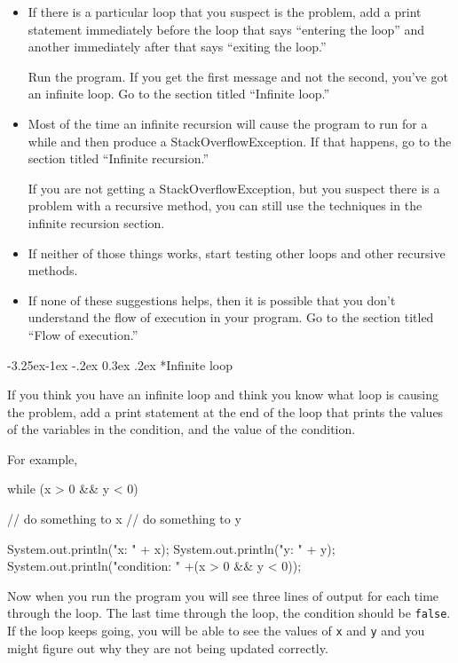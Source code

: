 \documentclass{book}
\makeatletter
\renewcommand\subsubsection{\@startsection {subsubsection}{3}{0mm}%
    {-3.25ex\@plus -1ex \@minus -.2ex}%
    {0.3ex \@plus .2ex}%
    {\normalfont\normalsize\bfseries}}
\makeatother
\begin{document}
\begin{itemize}

\item If there is a particular loop that you suspect is the
problem, add a print statement immediately before the loop
that says
``entering the loop'' and another immediately after that
says ``exiting the loop.''

Run the program.  If you get the first message and not
the second, you've got an infinite loop.  Go to the section
titled ``Infinite loop.''

\item Most of the time an infinite recursion will cause the program
to run for a while and then produce a StackOverflowException.
If that happens, go to the section
titled ``Infinite recursion.''

If you are not getting a StackOverflowException, but you suspect
there is a problem with a recursive method, you can still use
the techniques in the infinite recursion section.

\item If neither of those things works, start testing other
loops and other recursive methods.

\item If none of these suggestions helps, then it is possible that
you don't understand the flow of execution in your program.
Go to the section titled ``Flow of execution.''

\end{itemize}


\subsubsection*{Infinite loop}

If you think you have an infinite loop and think you know
what loop is causing the problem, add a print statement at
the end of the loop that prints the values of the variables in
the condition, and the value of the condition.

For example,

\begin{verbatimtab}
    while (x > 0 && y < 0) {
        // do something to x
        // do something to y

        System.out.println("x: " + x);
        System.out.println("y: " + y);
        System.out.println("condition: " +(x > 0 && y < 0));
    }
\end{verbatimtab}
%
Now when you run the program you will see three lines of output
for each time through the loop.  The last time through the
loop, the condition should be {\tt false}.  If the loop keeps
going, you will be able to see the values of {\tt x} and {\tt y}
and you might figure out why they are not being updated correctly.
\end{document}
